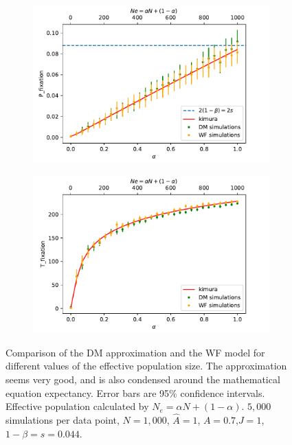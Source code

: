 \documentclass[11pt]{article}
\begin{document}
\begin{figure}[t]
  \begin{center}
  \begin{subfigure}[a]{0.49\linewidth}
    \caption{}
    \includegraphics[width=\linewidth]{../figures/binary/fix_prob_var_alpha.pdf}
   \end{subfigure}
   \begin{subfigure}[a]{0.49\linewidth}
     \caption{}
    \includegraphics[width=\linewidth]{../figures/binary/fix_time_var_alpha.pdf}
   \end{subfigure}
  \end{center}
  \caption{Comparison of the DM approximation and the WF model for different values of the effective population size. The approximation seems very good, and is also condensed around the mathematical equation expectancy. Error bars are 95\% confidence intervals.
  Effective population calculated by $N_e=\alpha N + (1-\alpha)$.
  $5,000$ simulations per data point, $N=1,000$, $\hat{A}=1$, $A=0.7$,$J=1$,$1-\beta=s=0.044$.}
  \label{fig:var_alpha}
\end{figure}
\end{document}
